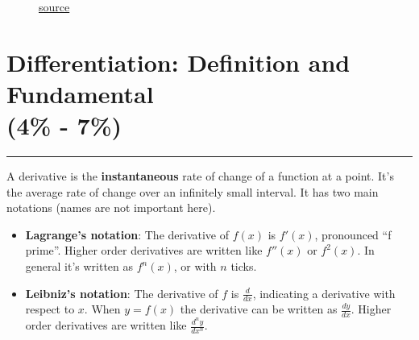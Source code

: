 \documentclass[12pt]{article}
\newcommand{\fline}{\par\noindent\rule{\textwidth}{0.1pt}} %
\begin{document}
            \begin{figure}[H]
                \begin{center}
                    \caption{\href{https://www.mathsisfun.com/algebra/intermediate-value-theorem.html}{source}}
                    \label{fig:intvaltheorem}
                \end{center}
            \end{figure}

    \section[Differentiation: Definition and Fundamental Properties (4\% - 7\%)]{Differentiation: Definition and Fundamental \\ (4\% - 7\%)}
    \fline

        A derivative is the \textbf{instantaneous} rate of change of a function at a point. It's the average rate of change over an infinitely small interval. It has two main notations (names are not important here).
        \begin{itemize} %
            \item \textbf{Lagrange's notation}:
            The derivative of $f(x)$ is $f'(x)$, pronounced ``f prime''. Higher order derivatives are written like $f''(x)$ or $f^2(x)$. In general it's written as $f^{n}(x)$, or with $n$ ticks.
            \item \textbf{Leibniz's notation}:
            The derivative of $f$ is $\frac{d}{dx}$, indicating a derivative with respect to $x$. When $y=f(x)$ the derivative can be written as $\frac{dy}{dx}$. Higher order derivatives are written like $\frac{d^{n}y}{dx^{n}}$.
        \end{itemize}
\end{document}
